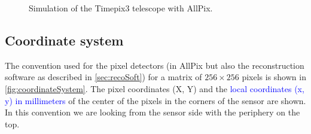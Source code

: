 \begin{figure}[htbp]
  \centering
  \caption{Simulation of the Timepix3 telescope with AllPix.}
  \label{fig:TPX3TelescopeAllpix}
\end{figure}

\subsection{Coordinate system}

The convention used for the pixel detectors (in AllPix but also the
reconstruction software as described in \cref{sec:recoSoft}) for a
matrix of $256\times256$ pixels is shown in
\cref{fig:coordinateSystem}. The pixel coordinates (X, Y) and the
\textcolor{blue}{local coordinates (x, y) in millimeters} of the
center of the pixels in the corners of the sensor are shown. In this
convention we are looking from the sensor side with the periphery on
the top.

